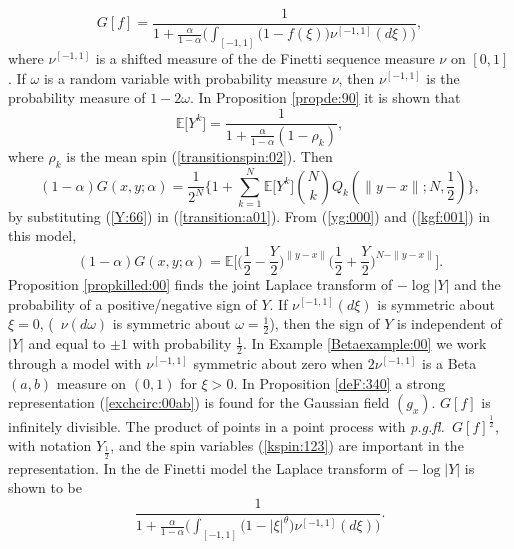 \documentclass[preprint,11pt]{elsarticle}
\theoremstyle{remark}
\def\spin{{[-1,1]}}
\def\pgfl{\emph{p.g.fl.~}}
\begin{document}
{\begin{equation*}
G[f] = \frac{1}{1 + \frac{\alpha}{1-\alpha}\Big (
\int_\spin \big (1-f(\xi)\big )\nu^\spin(d\xi)\Big )},
\label{pgfl:123}
\end{equation*}
where $\nu^\spin$ is a shifted measure of the de Finetti sequence measure $\nu$ on $[0,1]$. If $\omega$ is a random variable with probability measure $\nu$, then $\nu^\spin$ is the probability measure of $1-2\omega$.
In Proposition \ref{propde:90} it is shown that
\begin{equation}
\mathbb{E}\big [Y^k\big ] = \frac{1}{1 + \frac{\alpha}{1-\alpha}(1-\rho_k)},
\label{Y:66}
\end{equation}
where $\rho_k$ is the mean spin (\ref{transitionspin:02}).
Then
\begin{equation}
(1-\alpha) G(x,y;\alpha) = \frac{1}{2^N}\Big \{1 + \sum_{k=1}^N\mathbb{E}\big [Y^k\big ]{N\choose k}Q_k(\|y-x\|;N,\frac{1}{2})\Big \},
\label{yg:000}
\end{equation}
by substituting (\ref{Y:66}) in (\ref{transition:a01}).
 From (\ref{yg:000}) and (\ref{kgf:001}) in this model,
\begin{equation}
(1-\alpha)G(x,y;\alpha)	
=  \mathbb{E}\Big [ 
\Big (\frac{1}{2}-\frac{Y}{2}\Big )^{\|y-x\|}\Big (\frac{1}{2}+\frac{Y}{2}\Big )^{N-\|y-x\|}\Big ].
\label{introeigen:00}
\end{equation}
Proposition \ref{propkilled:00} finds the joint Laplace transform of $-\log |Y|$ and the probability of a positive/negative sign of $Y$. If $\nu^\spin(d\xi)$ is symmetric about 
$\xi=0$, (\ $\nu(d\omega)$ is symmetric about $\omega = \frac{1}{2}$), then the sign of $Y$ is independent of $|Y|$ and equal to $\pm 1$ with probability $\frac{1}{2}$. 
In Example \ref{Betaexample:00} we work through a model with $\nu^\spin$ symmetric about zero when $2\nu^\spin$ is a Beta$(a,b)$ measure on $(0,1)$ for $\xi > 0$.
In Proposition \ref{deF:340} a strong representation (\ref{exchcirc:00ab})
is found for the Gaussian field $(g_x)$. $G[f]$ is infinitely divisible. The product of points in a point process with \pgfl $G[f]^{\frac{1}{2}}$, with notation $Y_{\frac{1}{2}}$, and the spin variables (\ref{kspin:123}) 
 are important in the representation.
% 
In the de Finetti model the Laplace transform of $-\log |Y|$ is shown to be
\begin{equation*}
 \frac{1}{1 + \frac{\alpha}{1-\alpha}\Big (
\int_\spin \big (1-|\xi|^\theta\big )\nu^\spin(d\xi)\Big )}.
\label{intro:55}
\end{equation*}
}
\end{document}
